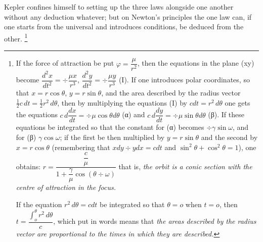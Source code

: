 \documentclass[12pt,a4paper]{book}
\begin{document}
Kepler confines himself to setting up the three laws alongside one another without any deduction
whatever; but on Newton's principles the one law can, if one starts from the universal and introduces
conditions, be deduced from the other.%
\footnote{%
If the force of attraction be put $\varphi = \dfrac{\mu}{r^{2}}$, then the equations in the plane (xy)
become $\dfrac{d^{2}x}{dt^{2}} = \div \dfrac{\mu x}{r^{3}}$,
$\dfrac{d^{2}y}{dt^{2}} = \div \dfrac{\mu y}{r^{3}}$ (I).
If one introduces polar coordinates, so that $x = r \cos \theta $, $y = r \sin \theta $, and the area
described by the radius vector $\tfrac{1}{2} c\, dt = \tfrac{1}{2} r^{2}\, d\theta $, then by
multiplying the equations (I) by $cdt = r^{2}\, d\theta $ one gets the equations
$c\, d \dfrac{dx}{dt} = \div \mu \cos \theta d\theta $ (α) and
$c\, d \dfrac{dy}{dt} = \div \mu \sin \theta d\theta $ (β).
If these equations be integrated so that the constant for (α) becomes $\div \gamma \sin \omega $, and
for (β) $\gamma \cos \omega $; if the first be then multiplied by $y = r \sin \theta $ and the second by
$x = r \cos \theta $ (remembering that $xdy \div ydx = cdt$ and
$\sin^{2} \theta + \cos^{2} \theta = 1$), one obtains:
$r = \dfrac{\dfrac{c}{\mu}}{1 + \dfrac{\gamma}{\mu} \cos (\theta \div \omega)}$
that is, \emph{the orbit is a conic section with the centre of attraction in the focus.}

If the equation $r^{2}\, d\theta = cdt$ be integrated so that $\theta = o$ when $t = o$, then
$t = \dfrac{\displaystyle\int_{o}^{\theta} r^{2}\, d\theta}{c}$,
which put in words means that \emph{the areas described by the radius vector are proportional to the
times in which they are described.}

}
\end{document}
